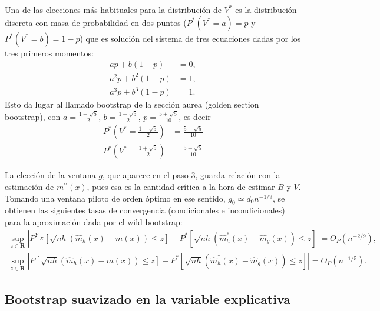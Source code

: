 \documentclass[]{book}
\theoremstyle{definition}
\theoremstyle{definition}
\theoremstyle{definition}
\theoremstyle{remark}
\begin{document}
Una de las elecciones más habituales para la distribución de
\(V^{\ast}\) es la distribución discreta con masa de probabilidad en dos
puntos (\(P^{\ast}\left( V^{\ast}=a \right) =p\) y
\(P^{\ast}\left( V^{\ast}=b \right) =1-p\)) que es solución del sistema
de tres ecuaciones dadas por los tres primeros momentos:
\[\begin{aligned}
ap+b\left( 1-p \right) &= 0, \\
a^2p+b^2\left( 1-p \right) &= 1, \\
a^{3}p+b^{3}\left( 1-p \right) &= 1.
\end{aligned}\] Esto da lugar al llamado bootstrap de la sección aurea
(golden section bootstrap), con \(a=\frac{1-\sqrt{5}}{2}\),
\(b=\frac{1+\sqrt{5}}{2}\), \(p=\frac{ 5+\sqrt{5}}{10}\), es decir
\[\begin{aligned}
P^{\ast}\left( V^{\ast}=\frac{1-\sqrt{5}}{2} \right) &= \frac{5+\sqrt{5}}{10} \\
P^{\ast}\left( V^{\ast}=\frac{1+\sqrt{5}}{2} \right) &= \frac{5-\sqrt{5}}{10}
\end{aligned}\]

La elección de la ventana \(g\), que aparece en el paso 3, guarda
relación con la estimación de \(m^{\prime \prime }\left( x \right)\),
pues esa es la cantidad crítica a la hora de estimar \(B\) y \(V\).
Tomando una ventana piloto de orden óptimo en ese sentido,
\(g_{0}\simeq d_{0}n^{-1/9}\), se obtienen las siguientes tasas de
convergencia (condicionales e incondicionales) para la aproximación dada
por el wild bootstrap: \[\begin{gathered}
\sup_{z\in \boldsymbol{R}} \left\vert P^{\left. Y\right\vert _{X}}\left[ 
\sqrt{nh}\left( \hat{m}_{h}\left( x \right) -m\left( x \right) \right) \leq z
\right] - P^{\ast}\left[ \sqrt{nh}\left( \hat{m}_{h}^{\ast}\left( x \right) -
\hat{m}_{g}\left( x \right) \right) \leq z\right] \right\vert = O_{P}\left( n^{-2/9} \right), 
\\
\sup_{z\in \boldsymbol{R}} \left\vert P\left[ \sqrt{nh}\left( \hat{m}
_{h}\left( x \right) -m\left( x \right) \right) \leq z\right] 
 - P^{\ast}\left[ \sqrt{nh}\left( \hat{m}_{h}^{\ast}\left( x \right) -\hat{m}_{g}\left(
x \right) \right) \leq z\right] \right\vert = O_{P}\left( n^{-1/5} \right).
\end{gathered}\]

\subsection{Bootstrap suavizado en la variable
explicativa}\label{bootstrap-suavizado-en-la-variable-explicativa}
\end{document}
